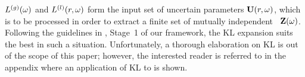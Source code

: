 ${L^{(g)}}(\omega)$ and $L^{(l)}(r, \omega)$ form the input set of uncertain parameters $\mathbf{U}(r, \omega)$, which is to be processed in order to extract a finite set of mutually independent \rvs\ $\mathbf{Z}(\omega)$. Following the guidelines in , Stage~1 of our framework, the KL expansion suits the best in such a situation. Unfortunately, a thorough elaboration on KL is out of the scope of this paper; however, the interested reader is referred to  in the appendix where an application of KL to  is shown.
